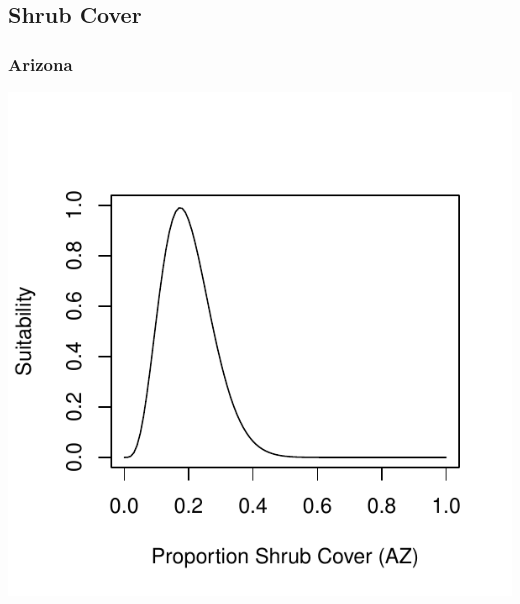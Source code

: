\documentclass[12pt,letterpaper]{article}\usepackage{graphicx, color}
\makeatletter
\def\maxwidth{ %
  \ifdim\Gin@nat@width>\linewidth
    \linewidth
  \else
    \Gin@nat@width
  \fi
}
\newenvironment{knitrout}{}{} %
\makeatother
\begin{document}
\subsection{Shrub Cover}
\subsubsection{Arizona}
\begin{knitrout}
\color{fgcolor}\includegraphics[width=\maxwidth]{figure/Goodwin_Shrub_Cover_AZ} 
\end{knitrout}
\end{document}
